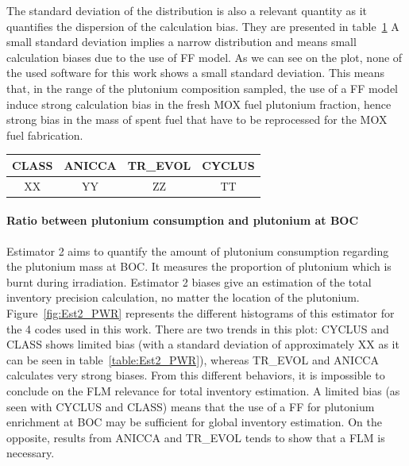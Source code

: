 The standard deviation of the distribution is also a relevant quantity as it quantifies the dispersion of the calculation bias. They are presented in table~\ref{table:Est1_PWR} A small standard deviation implies a narrow distribution and means small calculation biases due to the use of FF model. As we can see on the plot, none of the used software for this work shows a small standard deviation. This means that, in the range of the plutonium composition sampled, the use of a FF model induce strong calculation bias in the fresh MOX fuel plutonium fraction, hence strong bias in the mass of spent fuel that have to be reprocessed for the MOX fuel fabrication.

\begin{table}[h]
	\begin{center}
		\begin{tabular}{|c||c||c||c|}
			\hline 
				CLASS & ANICCA & TR\_EVOL & CYCLUS \\
			\hline
				XX & YY & ZZ & TT \\
		\end{tabular}
	\end{center}
	\label{table:Est1_PWR}
\end{table}

\paragraph{Ratio between plutonium consumption and plutonium at BOC}
Estimator 2 aims to quantify the amount of plutonium consumption regarding the plutonium mass at BOC. It measures the proportion of plutonium which is burnt during irradiation. Estimator 2 biases give an estimation of the total inventory precision calculation, no matter the location of the plutonium. 
Figure~\ref{fig:Est2_PWR} represents the different histograms of this estimator for the 4 codes used in this work. There are two trends in this plot: CYCLUS and CLASS shows limited bias (with a standard deviation of approximately XX as it can be seen in table~\ref{table:Est2_PWR}), whereas TR\_EVOL and ANICCA calculates very strong biases. From this different behaviors, it is impossible to conclude on the FLM relevance for total inventory estimation. A limited bias (as seen with CYCLUS and CLASS) means that the use of a FF for plutonium enrichment at BOC may be sufficient for global inventory estimation. On the opposite, results from ANICCA and TR\_EVOL tends to show that a FLM is necessary. 

